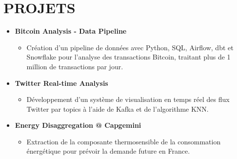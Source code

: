 \documentclass[letterpaper,11pt]{article}
\newcommand{\resumeItem}[1]{
  \item\small{
    {#1 \vspace{-1pt}}
  }
}
\newcommand{\resumeProjectHeading}[2]{
  \item
  {#1} \hfill {#2}
}
\newcommand{\resumeSubHeadingListStart}{\begin{itemize}[leftmargin=0in, label={}]}
\newcommand{\resumeSubHeadingListEnd}{\end{itemize}}
\newcommand{\resumeItemListStart}{\begin{itemize}[label={\textbullet}]}
\newcommand{\resumeItemListEnd}{\end{itemize}\vspace{0pt}}
\begin{document}
\section{PROJETS}
\resumeSubHeadingListStart
    \resumeProjectHeading
      {\textbf{Bitcoin Analysis - Data Pipeline}} {}
      \resumeItemListStart
        \resumeItem{Création d'un pipeline de données avec Python, SQL, Airflow, dbt et Snowflake pour l'analyse des transactions Bitcoin, traitant plus de 1 million de transactions par jour.}
      \resumeItemListEnd
    \resumeProjectHeading
      {\textbf{Twitter Real-time Analysis}} {}
      \resumeItemListStart
        \resumeItem{Développement d'un système de visualisation en temps réel des flux Twitter par topics à l'aide de Kafka et de l'algorithme KNN.}
      \resumeItemListEnd
    \resumeProjectHeading
      {\textbf{Energy Disaggregation @ Capgemini}} {}
      \resumeItemListStart
        \resumeItem{Extraction de la composante thermosensible de la consommation énergétique pour prévoir la demande future en France.}
      \resumeItemListEnd
\resumeSubHeadingListEnd
\end{document}
